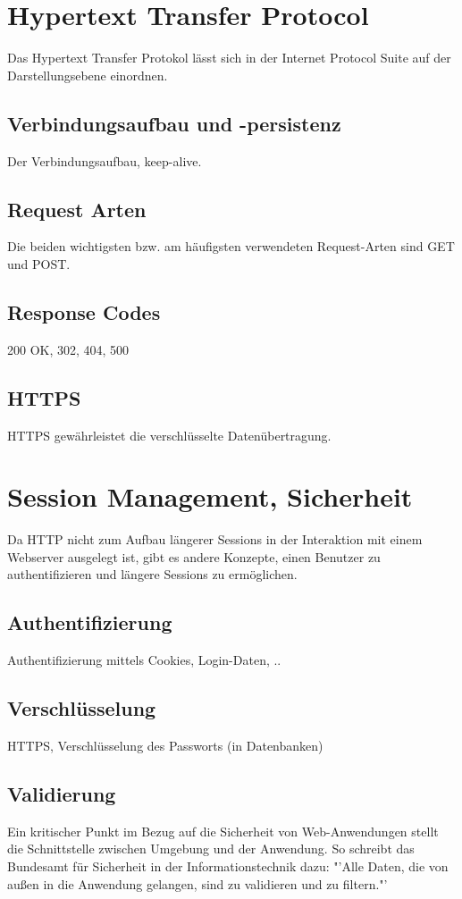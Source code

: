\documentclass[12pt]{report}
\begin{document}
\section{Hypertext Transfer Protocol}
Das Hypertext Transfer Protokol lässt sich in der Internet Protocol Suite auf der Darstellungsebene einordnen.\cite{wiki:HTTP}
\subsection{Verbindungsaufbau und -persistenz}
Der Verbindungsaufbau, keep-alive.
\subsection{Request Arten}
Die beiden wichtigsten bzw. am häufigsten verwendeten Request-Arten sind GET und POST.
\subsection{Response Codes}
200 OK, 302, 404, 500
\subsection{HTTPS}
HTTPS gewährleistet die verschlüsselte Datenübertragung.

\section{Session Management, Sicherheit}
Da HTTP nicht zum Aufbau längerer Sessions in der Interaktion mit einem Webserver ausgelegt ist, gibt es andere Konzepte, einen Benutzer zu authentifizieren und längere Sessions zu ermöglichen.
\subsection{Authentifizierung}
Authentifizierung mittels Cookies, Login-Daten, ..
\subsection{Verschlüsselung}
HTTPS, Verschlüsselung des Passworts (in Datenbanken)
\subsection{Validierung}
Ein kritischer Punkt im Bezug auf die Sicherheit von Web-Anwendungen stellt die Schnittstelle zwischen Umgebung und der Anwendung. \cite[S.212]{ebooks:Architekturen} So schreibt das Bundesamt für Sicherheit in der Informationstechnik dazu: "'Alle Daten, die von außen in die Anwendung gelangen, sind zu validieren und zu filtern."'
\cite[S.20]{BSI}
\end{document}
